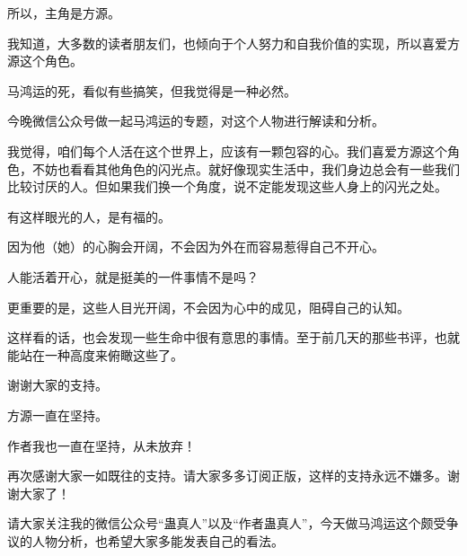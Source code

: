 \begin{this_body}
所以，主角是方源。

我知道，大多数的读者朋友们，也倾向于个人努力和自我价值的实现，所以喜爱方源这个角色。

马鸿运的死，看似有些搞笑，但我觉得是一种必然。

今晚微信公众号做一起马鸿运的专题，对这个人物进行解读和分析。

我觉得，咱们每个人活在这个世界上，应该有一颗包容的心。我们喜爱方源这个角色，不妨也看看其他角色的闪光点。就好像现实生活中，我们身边总会有一些我们比较讨厌的人。但如果我们换一个角度，说不定能发现这些人身上的闪光之处。

有这样眼光的人，是有福的。

因为他（她）的心胸会开阔，不会因为外在而容易惹得自己不开心。

人能活着开心，就是挺美的一件事情不是吗？

更重要的是，这些人目光开阔，不会因为心中的成见，阻碍自己的认知。

这样看的话，也会发现一些生命中很有意思的事情。至于前几天的那些书评，也就能站在一种高度来俯瞰这些了。

谢谢大家的支持。

方源一直在坚持。

作者我也一直在坚持，从未放弃！

再次感谢大家一如既往的支持。请大家多多订阅正版，这样的支持永远不嫌多。谢谢大家了！

请大家关注我的微信公众号“蛊真人”以及“作者蛊真人”，今天做马鸿运这个颇受争议的人物分析，也希望大家多能发表自己的看法。

\end{this_body}

